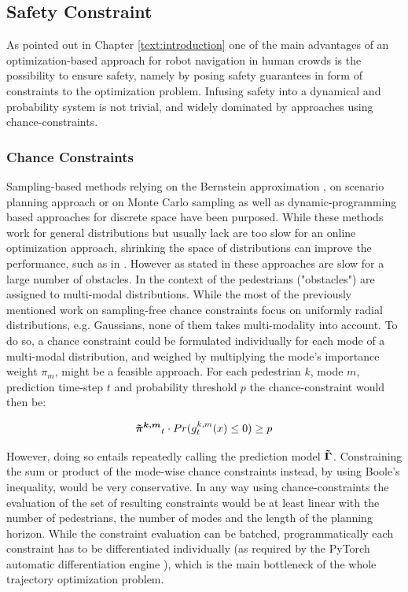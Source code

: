 \subsection{Safety Constraint}
\label{text:approach/constraint/safety}
As pointed out in Chapter \ref{text:introduction} one of the main advantages of an optimization-based approach for robot navigation in human crowds is the possibility to ensure safety, namely by posing safety guarantees in form of constraints to the optimization problem. Infusing safety into a dynamical and probability system is not trivial, and widely dominated by approaches using chance-constraints. 

\subsubsection{Chance Constraints}
Sampling-based methods relying on the Bernstein approximation \cite{Calafiore2005}, on scenario planning approach \cite{Bemporad1999} or on Monte Carlo sampling \cite{Hong2011}\cite{Janson2015} as well as dynamic-programming based approaches for discrete space \cite{Yin-LamChow2013}\cite{Ono2015} \cite{Chow2015a} have been purposed. While these methods work for general distributions but usually lack are too slow for an online optimization approach, shrinking the space of distributions can improve the performance, such as in \cite{Chen2018}\cite{Calafiore2006}\cite{Carvalho2014}\cite{Blackmore2009}\cite{Blackmore2011}. 
\newline
However as stated in \cite{Lew2020} these approaches are slow for a large number of obstacles. In the context of \project the pedestrians ("obstacles") are assigned to multi-modal distributions. While the most of the previously mentioned work on sampling-free chance constraints focus on uniformly radial distributions, e.g. Gaussians, none of them takes multi-modality into account. To do so, a chance constraint could be formulated individually for each mode of a multi-modal distribution, and weighed by multiplying the mode's importance weight $\pi_m$, might be a feasible approach. For each pedestrian $k$, mode $m$, prediction time-step $t$ and probability threshold $p$ the chance-constraint would then be:

\begin{equation}
\piped[k,m]_t \cdot Pr(g_t^{k,m}(x)\leq 0) \geq p
\end{equation}

However, doing so entails repeatedly calling the prediction model $\distmodel[]$. Constraining the sum or product of the mode-wise chance constraints instead, by using Boole's inequality, would be very conservative. In any way using chance-constraints the evaluation of the set of resulting constraints would be at least linear with the number of pedestrians, the number of modes and the length of the planning horizon. While the constraint evaluation can be batched, programmatically each constraint has to be differentiated individually (as required by the PyTorch automatic differentiation engine \cite{pytorch}), which is the main bottleneck of the whole trajectory optimization problem. 


